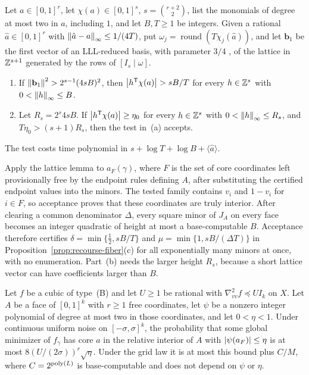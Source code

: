 \begin{lemma}
\label{lem:recourse-lattice}
Let $a\in[0,1]^r$, let $\chi(a)\in[0,1]^s$, $s=\binom{r+2}2$, list
the monomials of degree at most two in $a$, including $1$, and let
$B,T\ge1$ be integers. Given a rational $\hat a\in[0,1]^r$ with
$\left\lVert\hat a-a\right\rVert_\infty\le1/(4T)$, put
$\omega_j=\operatorname{round}(T\chi_j(\hat a))$, and let
$\mathbf b_1$ be the first vector of an LLL-reduced basis, with
parameter $3/4$ \citep{LenstraLenstraLovasz1982}, of the lattice in
$\mathbb Z^{s+1}$ generated by the rows of $[I_s\mid\omega]$.
\begin{enumerate}[label=(\alph*)]
\item If $\left\lVert\mathbf b_1\right\rVert^2>2^{s-1}(4sB)^2$, then
$\left\lvert h^{\mathsf T}\chi(a)\right\rvert>sB/T$ for every $h\in\mathbb Z^s$ with
$0<\left\lVert h\right\rVert_\infty\le B$.
\item Let $R_s=2^s4sB$. If $\left\lvert h^{\mathsf T}\chi(a)\right\rvert\ge\eta_0$ for
every $h\in\mathbb Z^s$ with $0<\left\lVert h\right\rVert_\infty\le R_s$, and
$T\eta_0>(s+1)R_s$, then the test in~(a) accepts.
\end{enumerate}
The test costs time polynomial in
$s+\log T+\log B+\langle\hat a\rangle$.
\end{lemma}

Apply the lattice lemma to $a_F(\gamma)$, where $F$ is the set of core
coordinates left provisionally free by the endpoint rules defining $A$,
after substituting the certified endpoint values into the minors. The tested
family contains $v_i$ and $1-v_i$ for $i\in F$, so acceptance proves that
these coordinates are truly interior. After clearing a
common denominator $\Delta$, every square minor of $J_A$ on every face
becomes an integer quadratic of height at most a base-computable $B$.
Acceptance therefore certifies $\delta=\min\{\frac12,sB/T\}$ and
$\mu=\min\{1,sB/(\Delta T)\}$ in
Proposition~\ref{prop:recourse-fiber}(c) for all exponentially many
minors at once, with no enumeration. Part~(b) needs the larger height
$R_s$, because a short lattice vector can have coefficients larger
than $B$.

\begin{proposition}
\label{prop:recourse-margin-probability}
Let $f$ be a cubic of type~(B) and let $U\ge1$ be rational with
$\nabla^2_{vv}f\preceq UI_k$ on $X$. Let $A$ be a face of $[0,1]^k$
with $r\ge1$ free coordinates, let $\psi$ be a nonzero integer
polynomial of degree at most two in those coordinates, and let
$0<\eta<1$. Under continuous uniform noise on $[-\sigma,\sigma]^k$, the
probability that some global minimizer of $f_\gamma$ has core $a$ in
the relative interior of $A$ with $\left\lvert\psi(a_F)\right\rvert\le\eta$ is at most
$8(U/(2\sigma))^r\sqrt\eta$. Under the grid law it is at most this
bound plus $C/M$, where $C=2^{\operatorname{poly}(L)}$ is base-computable and does not
depend on $\psi$ or $\eta$.
\end{proposition}

